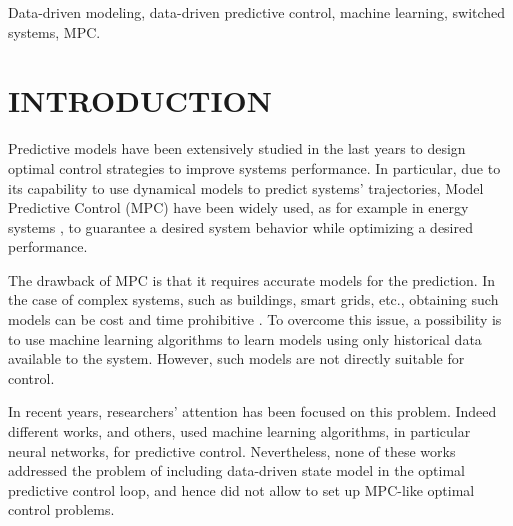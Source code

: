 \documentclass[letterpaper, 10 pt, conference]{ifacconf}  %
\begin{document}
\begin{frontmatter}
\begin{keyword}
	Data-driven modeling, data-driven predictive control, machine learning, switched systems, MPC.
\end{keyword}

\end{frontmatter}

\section{INTRODUCTION}\label{secIntro}
Predictive models have been extensively studied in the last years to design optimal control strategies to improve systems performance. In particular, due to its capability to use dynamical models to predict systems' trajectories, Model Predictive Control (MPC) have been widely used, as for example in energy systems \cite{MaTCST2015,OldewurtelEB2012,MaasoumyEB2014,IovineIFAC2017}, to guarantee a desired system behavior while optimizing a desired performance.

The drawback of MPC is that it requires accurate models for the prediction. In the case of complex systems, such as buildings, smart grids, etc., obtaining such models can be cost and time prohibitive \cite{SturzeneggerTCST2016}. To overcome this issue, a possibility is to use machine learning algorithms to learn models using only historical data available to the system. However, such models are not directly suitable for control.

In recent years, researchers' attention has been focused on this problem. Indeed different works, \cite{Macarulla2017,Afram2017,Ferreira2012} and others, used machine learning algorithms, in particular neural networks, for predictive control. Nevertheless, none of these works addressed the problem of including data-driven state model in the optimal predictive control loop, and hence did not allow to set up MPC-like optimal control problems.
\end{document}
